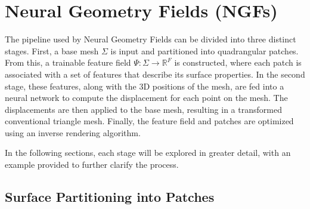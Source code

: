 \section{Neural Geometry Fields (NGFs)}\label{Sec:MainPart}

The pipeline used by Neural Geometry Fields can be divided into three distinct stages. 
First, a base mesh $\Sigma$ is input and partitioned into quadrangular patches. 
From this, a trainable feature field $\Psi : \Sigma \rightarrow \mathbb{R}^F$ is constructed, where each patch is associated with a set of features that describe its surface properties. 
In the second stage, these features, along with the 3D positions of the mesh, are fed into a neural network to compute the displacement for each point on the mesh. 
The displacements are then applied to the base mesh, resulting in a transformed conventional triangle mesh. 
Finally, the feature field and patches are optimized using an inverse rendering algorithm. 

In the following sections, each stage will be explored in greater detail, with an example provided to further clarify the process. 





\subsection{Surface Partitioning into Patches}

